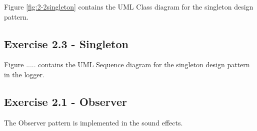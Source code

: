 Figure \ref{fig:2-2singleton} contains the UML Class diagram for the singleton design pattern.
\subsection{Exercise 2.3 - Singleton}
Figure ..... contains the UML Sequence diagram for the singleton design pattern in the logger.
\subsection{Exercise 2.1 - Observer}
The Observer pattern is implemented in the sound effects.

